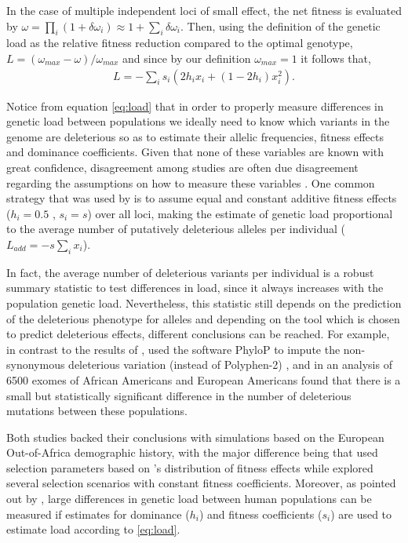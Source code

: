 \documentclass[a4paper, 12pt]{article}
\begin{document}
In the case of multiple independent  loci of small effect, the net fitness is
evaluated by $\omega = \prod_i (1 + \delta \omega_i) \approx 1 + \sum_i \delta
\omega_i$. Then, using the definition of the genetic load as the relative
fitness reduction compared to the optimal genotype, $L = (\omega_{max} -
\omega)/\omega_{max}$ and since by our definition $\omega_{max} = 1$ it follows
that, 
\begin{align} 
  L = - \sum_i s_i (2 h_i x_i + (1 - 2h_i)x_i^2).
  \label{eq:load} 
\end{align}

Notice from equation \eqref{eq:load} that in order to properly measure
differences in  genetic load  between populations we ideally need to know which
variants in the genome are deleterious so as to estimate their allelic
frequencies, fitness effects and dominance coefficients. Given that none of
these variables are known with great confidence, disagreement among studies are
often due disagreement regarding the assumptions on how to measure these
variables \citep{Henn2015a,Gravel2016}. One common strategy that was used by
\cite{Simons2014,Do2015} is to assume equal and constant additive fitness
effects ($h_i = 0.5$ , $s_i = s$) over all loci, making the estimate of genetic
load proportional to the average number of putatively deleterious alleles per
individual ($L_{add} = -s \sum_i x_i$).


In fact, the average number of deleterious variants per individual is a robust
summary statistic to test differences in load, since it always increases with
the population genetic load. Nevertheless, this statistic still depends on the
prediction of the deleterious phenotype for  alleles  and depending on the tool
which is chosen to predict deleterious effects, different conclusions can be
reached. For example, in contrast to the results of \cite{Simons2014},
\cite{Fu2014} used the software PhyloP \citep{Pollard2010} to impute the
non-synonymous deleterious variation (instead of Polyphen-2)
\citep{Adzhubei2010}, and in an analysis of 6500 exomes of African Americans
and European Americans found that there is a small but statistically
significant difference in the number of deleterious mutations  between these
populations.

Both studies backed their conclusions with simulations based on the European
Out-of-Africa demographic history, with the major difference being that
\cite{Fu2014} used selection parameters based on \cite{Eyre-walker2007}'s
distribution of fitness effects while \cite{Simons2014} explored  several
selection scenarios with constant fitness coefficients.  Moreover, as pointed
out by \cite{Henn2015b}, large differences in genetic load between human
populations can be measured  if estimates for  dominance ($h_i$) and fitness
coefficients ($s_i$) are used to estimate load according to \eqref{eq:load}.
\end{document}
